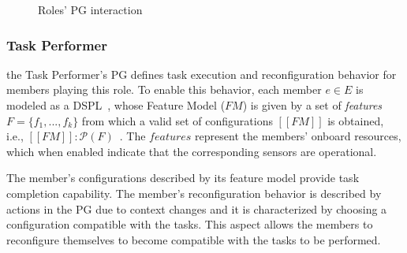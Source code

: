 \begin{figure}[!ht]
    \centering
    \scalebox{.75}{}
    \caption{Roles' PG interaction}
    \label{fig:diagram}
\end{figure}



\subsubsection{Task Performer}


 the Task Performer's PG defines task execution and reconfiguration behavior for members playing this role. To enable this behavior, each member $e \in E$ is modeled as a DSPL~\citep{Hallsteinsen2008}, whose Feature Model ($FM$) is given by a set of \textit{features} $F=\{f_1, ...,f_k\}$ from which a valid set of configurations $[\![FM]\!]$ is obtained, i.e., $[\![FM]\!]: \mathcal{P}(F)$~\citep{Schobbens2006FeatureDA, Kang1990}. The $features$ represent the members’ onboard  resources, which when enabled indicate that the corresponding sensors are operational.

The member's configurations described by its feature model provide task completion capability. The member's reconfiguration behavior is described by actions in the PG due to context changes and it is characterized by choosing a configuration compatible with the tasks. This aspect allows the members to reconfigure themselves to become compatible with the tasks to be performed. 

